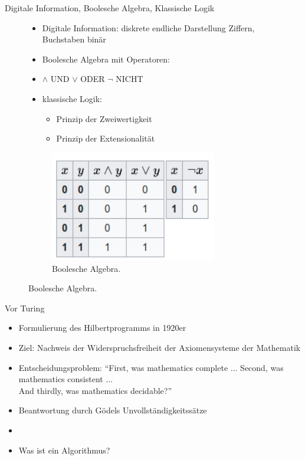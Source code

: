 \documentclass[aspectratio=1610, 9pt]{beamer}
\begin{document}
\begin{frame}{Digitale Information, Boolesche Algebra, Klassische Logik}
  \begin{figure}
    \begin{minipage}{0.7\textwidth}
      \begin{itemize}
        \item Digitale Information: diskrete endliche Darstellung \rightarrow Ziffern, Buchstaben \rightarrow binär
        \item Boolesche Algebra mit Operatoren:
        \item[] $\land$ UND $\lor$ ODER $\lnot$ NICHT
        \item klassische Logik:
        \begin{itemize}
          \item Prinzip der Zweiwertigkeit
          \item Prinzip der Extensionalität
        \end{itemize}
      \end{itemize}
    \end{minipage}
    \hfill
    \begin{minipage}{0.28\textwidth}
      \begin{figure}
        \includegraphics[width=0.8\textwidth]{images/bool.png}
        \caption{Boolesche Algebra.}
      \end{figure}
    \end{minipage}
  \end{figure}
\end{frame}

\begin{frame}{Vor Turing}
  \begin{itemize}
    \item Formulierung des Hilbertprogramms in 1920er
    \item Ziel: Nachweis der Widerspruchsfreiheit der Axiomensysteme der Mathematik
    \item[\rightarrow] Entscheidungsproblem: \enquote{First, was mathematics complete ... Second, was mathematics consistent ... \\ And thirdly, was mathematics decidable?}
    \item[\rightarrow] Beantwortung durch Gödels Unvollständigkeitssätze
    \item[]
    \item Was ist ein Algorithmus?
  \end{itemize}

\end{frame}
\end{document}
